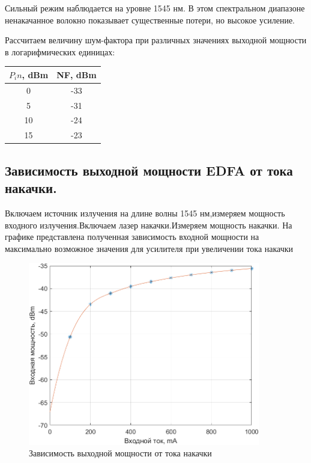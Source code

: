 \documentclass[12pt,a4paper]{article}
\begin{document}
Сильный режим наблюдается на уровне 1545 нм.
В этом спектральном диапазоне ненакачанное волокно показывает существенные потери, но высокое усиление. 

Рассчитаем величину шум-фактора при различных значениях выходной мощности в логарифмических единицах:

\begin{center}
\begin{tabular}{|c|c|}
    \hline
    $P_in$, dBm & NF, dBm \\
     \hline
     0 & -33 \\
     \hline
     5 & -31 \\
     \hline
     10 & -24 \\
     \hline
     15 &  -23 \\
     \hline
\end{tabular}
\end{center}

\newpage
 
\subsection{Зависимость выходной мощности EDFA от тока накачки.}
Включаем источник излучения на длине волны 1545 нм,измеряем мощность входного излучения.Включаем лазер накачки.Измеряем мощность накачки. На графике представлена полученная зависимость входной мощности на максимально возможное значения для усилителя при увеличении тока накачки

\begin{figure}[h!]
		\centering
		\includegraphics[width=0.6\linewidth, height=8cm]{point3.png}
		\caption{Зависимость выходной мощности от тока накачки}
		\label{labC}
	\end{figure}
	
\end{document}
